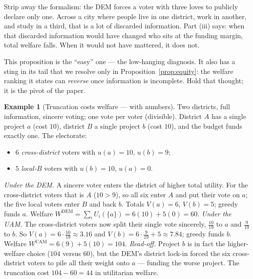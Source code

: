 \documentclass[11pt,letterpaper]{article}
\theoremstyle{definition}
\newtheorem{example}{Example}[section]
\theoremstyle{plain}
\theoremstyle{remark}
\newcommand{\DEM}{\text{DEM}}
\newcommand{\UAM}{\text{UAM}}
\begin{document}
\begin{intuition}
Strip away the formalism: the DEM forces a voter with three loves to publicly declare only one.
Across a city where people live in one district, work in another, and study in a third, that is a
lot of discarded information. Part (iii) says: when that discarded information would have changed
who sits at the funding margin, total welfare falls. When it would not have mattered, it does not.
\end{intuition}

\begin{aside}\small
This proposition is the ``easy'' one --- the low-hanging diagnosis. It also has a sting in its tail
that we resolve only in Proposition~\ref{prop:equity}: the welfare ranking it states can
\emph{reverse} once information is incomplete. Hold that thought; it is the pivot of the paper.
\end{aside}

\begin{example}[Truncation costs welfare --- with numbers]
\label{ex:trunc}
Two districts, full information, sincere voting; one vote per voter (divisible). District $A$ has a
single project $a$ (cost $10$), district $B$ a single project $b$ (cost $10$), and the budget funds
exactly one. The electorate:
\begin{itemize}[nosep]
  \item $6$ \emph{cross-district} voters with $u(a)=10$, $u(b)=9$;
  \item $5$ \emph{local-$B$} voters with $u(b)=10$, $u(a)=0$.
\end{itemize}
\emph{Under the DEM.} A sincere voter enters the district of higher total utility. For the
cross-district voters that is $A$ ($10>9$), so all six enter $A$ and put their vote on $a$; the five
local voters enter $B$ and back $b$. Totals $V(a)=6$, $V(b)=5$; greedy funds $a$. Welfare
$W^{\DEM}=\sum_i U_i(\{a\})=6(10)+5(0)=60$.
\emph{Under the UAM.} The cross-district voters now split their single vote sincerely, $\tfrac{10}{19}$
to $a$ and $\tfrac{9}{19}$ to $b$. So $V(a)=6\cdot\tfrac{10}{19}\approx3.16$ and
$V(b)=6\cdot\tfrac{9}{19}+5\approx7.84$; greedy funds $b$. Welfare $W^{\UAM}=6(9)+5(10)=104$.
\emph{Read-off.} Project $b$ is in fact the higher-welfare choice ($104$ versus $60$), but the DEM's
district lock-in forced the six cross-district voters to pile all their weight onto $a$ --- funding the
worse project. The truncation cost $104-60=44$ in utilitarian welfare.
\end{example}
\end{document}
